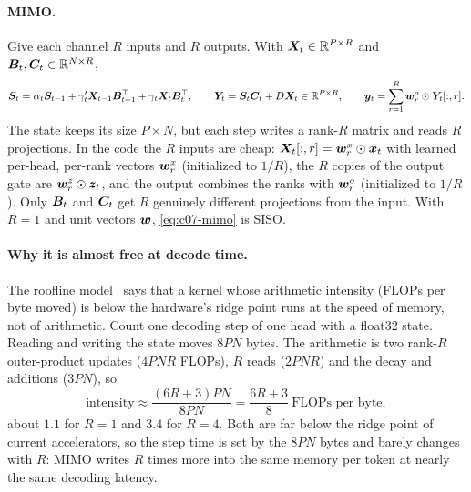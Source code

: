 \paragraph{MIMO.} Give each channel $R$ inputs and $R$ outputs. With
$\bm{X}_t\in\mathbb{R}^{P\times R}$ and $\bm{B}_t,\bm{C}_t\in\mathbb{R}^{N\times R}$,
\begin{equation}\label{eq:c07-mimo}
  \bm{S}_t = \alpha_t\bm{S}_{t-1} + \gamma'_t\bm{X}_{t-1}\bm{B}_{t-1}^{\top} + \gamma_t\bm{X}_t\bm{B}_t^{\top},\qquad
  \bm{Y}_t = \bm{S}_t\bm{C}_t + D\bm{X}_t\in\mathbb{R}^{P\times R},\qquad
  \bm{y}_t = \sum_{r=1}^{R}\bm{w}^{o}_r\odot\bm{Y}_t[:,r].
\end{equation}
The state keeps its size $P\times N$, but each step writes a rank-$R$ matrix and reads $R$
projections. In the code the $R$ inputs are cheap: $\bm{X}_t[:,r] = \bm{w}^{x}_r\odot\bm{x}_t$ with
learned per-head, per-rank vectors $\bm{w}^x_r$ (initialized to $1/R$), the $R$ copies of the
output gate are $\bm{w}^z_r\odot\bm{z}_t$, and the output combines the ranks with $\bm{w}^o_r$
(initialized to $1/R$). Only $\bm{B}_t$ and $\bm{C}_t$ get $R$ genuinely different projections from
the input. With $R = 1$ and unit vectors $\bm{w}$, \cref{eq:c07-mimo} is SISO.

\paragraph{Why it is almost free at decode time.} The roofline model~\citep{c01-williams2009roofline}
says that a kernel whose arithmetic intensity (FLOPs per byte moved) is below the hardware's
ridge point runs at the speed of memory, not of arithmetic. Count one decoding step of one
head with a float32 state. Reading and writing the state moves $8PN$ bytes. The arithmetic is
two rank-$R$ outer-product updates ($4PNR$ FLOPs), $R$ reads ($2PNR$) and the decay and
additions ($3PN$), so
\begin{equation}\label{eq:c07-intensity}
  \text{intensity} \approx \frac{(6R+3)PN}{8PN} = \frac{6R+3}{8}\ \text{FLOPs per byte},
\end{equation}
about $1.1$ for $R = 1$ and $3.4$ for $R = 4$. Both are far below the ridge point of current
accelerators, so the step time is set by the $8PN$ bytes and barely changes with $R$: MIMO
writes $R$ times more into the same memory per token at nearly the same decoding latency.

